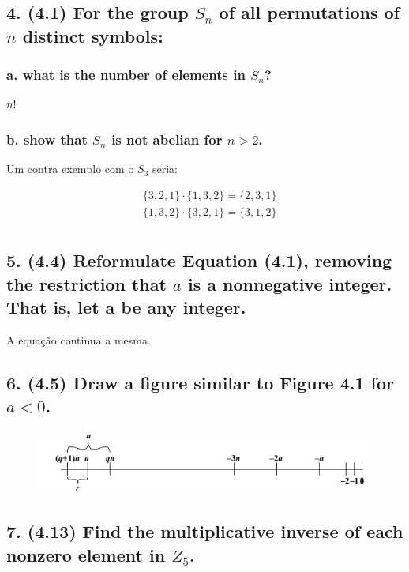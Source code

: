 \documentclass[fleqn, 12pt]{article}
\begin{document}
\subsection*{4. (4.1) For the group $S_n$ of all permutations of $n$ distinct
symbols:}
  \subsubsection*{a. what is the number of elements in $S_n$?}

    $n!$

  \subsubsection*{b. show that $S_n$ is not abelian for $n > 2$.}

    Um contra exemplo com o $S_3$ seria:

    \begin{align*}
      & \lbrace 3, 2, 1 \rbrace \cdot \lbrace 1, 3, 2 \rbrace = \lbrace 2, 3, 1 \rbrace \\
      & \lbrace 1, 3, 2 \rbrace \cdot \lbrace 3, 2, 1 \rbrace = \lbrace 3, 1, 2 \rbrace \\
    \end{align*}

\subsection*{5. (4.4) Reformulate Equation (4.1), removing the restriction that
$a$ is a nonnegative integer. That is, let a be any integer.}

    A equação continua a mesma.

\subsection*{6. (4.5) Draw a figure similar to Figure 4.1 for $a < 0$.}
  \begin{figure}[h]
    \includegraphics[width=\linewidth]{quatro_seis}
  \end{figure}

\subsection*{7. (4.13) Find the multiplicative inverse of each nonzero element in $Z_5$.}
\end{document}
